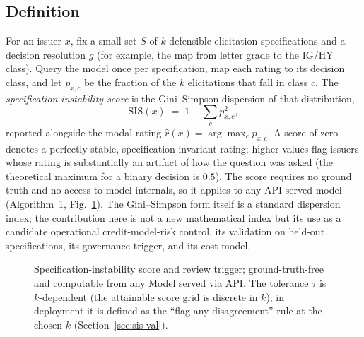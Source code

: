 \documentclass[a4paper,fleqn]{cas-sc}
\begin{document}
\subsection{Definition}
For an issuer $x$, fix a small set $S$ of $k$ defensible elicitation specifications and a decision
resolution $g$ (for example, the map from letter grade to the IG/HY class). Query the model once per
specification, map each rating to its decision class, and let $p_{x,c}$ be the fraction of the $k$
elicitations that fall in class $c$. The \emph{specification-instability score} is the Gini--Simpson
dispersion of that distribution,
\begin{equation}
\mathrm{SIS}(x) \;=\; 1 - \sum_{c} p_{x,c}^{2},
\end{equation}
reported alongside the modal rating $\hat{r}(x)=\arg\max_c p_{x,c}$. A score of zero denotes a perfectly
stable, specification-invariant rating; higher values flag issuers whose rating is substantially an
artifact of how the question was asked (the theoretical maximum for a binary decision is $0.5$). The score
requires no ground truth and no access to model internals, so it applies to any API-served model
(Algorithm~1, Fig.~\ref{alg:sis}). The Gini--Simpson form itself is a standard dispersion index; the
contribution here is not a new mathematical index but its use as a candidate operational credit-model-risk control,
its validation on held-out specifications, its governance trigger, and its cost model.

\begin{figure}[t]\centering
{}
\caption{Specification-instability score and review trigger; ground-truth-free and computable from any
Model served via API. The tolerance $\tau$ is $k$-dependent (the attainable score grid is discrete in $k$);
in deployment it is defined as the ``flag any disagreement'' rule at the chosen $k$ (Section~\ref{sec:sis-val}).}\label{alg:sis}
\end{figure}
\end{document}
